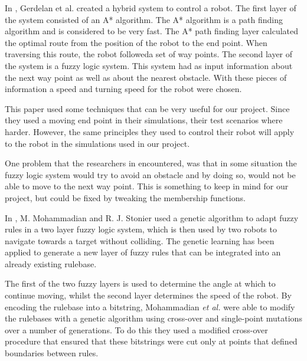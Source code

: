 \documentclass[conference]{IEEEtran}
\begin{document}
In \cite{gerdelan2006novel}, Gerdelan et al. created a hybrid system to control a robot. The first layer of the system consisted of an A* algorithm. The A* algorithm is a path finding algorithm and is considered to be very fast. The A* path finding layer calculated the optimal route from the position of the robot to the end point. When traversing this route, the robot followeda set of way points. The second layer of the system is a fuzzy logic system. This system had as input information about the next way point as well as about the nearest obstacle. With these pieces of information a speed and turning speed for the robot were chosen.

This paper used some techniques that can be very useful for our project. Since they used a moving end point in their simulations, their test scenarios where harder. However, the same principles they used to control their robot will apply to the robot in the simulations used in our project.

One problem that the researchers in \cite{gerdelan2006novel} encountered, was that in some situation the fuzzy logic system would try to avoid an obstacle and by doing so, would not be able to move to the next way point. This is something to keep in mind for our project, but could be fixed by tweaking the membership functions.

In \cite{mohammadian1995adaptive}, M. Mohammadian and R. J. Stonier used a genetic algorithm to adapt fuzzy rules in a two layer fuzzy logic system, which is then used by two robots to navigate towards a target without colliding.
The genetic learning has been applied to generate a new layer of fuzzy rules that can be integrated into an already existing rulebase.

The first of the two fuzzy layers is used to determine the angle at which to continue moving, whilst the second layer determines the speed of the robot. By encoding the rulebase into a bitstring, Mohammadian \textit{et al.}\cite{mohammadian1995adaptive} were able to modify the rulebases with a genetic algorithm using cross-over and single-point mutations over a number of generations. To do this they used a modified cross-over procedure that ensured that these bitstrings were cut only at points that defined boundaries between rules.
\end{document}
